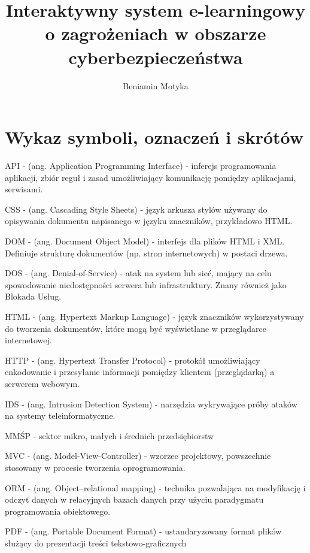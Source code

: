 \documentclass[12pt,twoside]{article}
\author{Beniamin Motyka}
\title{Interaktywny system e-learningowy o zagrożeniach w obszarze cyberbezpieczeństwa}
\begin{document}
\maketitle

\blankpage

\tableofcontents

\clearpage
\blankpage

\clearpage
\section*{Wykaz symboli, oznaczeń i skrótów}

API - (ang. Application Programming Interface) - inferejs programowania aplikacji, zbiór reguł i zasad umożliwiający komunikację pomiędzy aplikacjami, serwisami.

CSS - (ang. Cascading Style Sheets) - język arkusza stylów używany do opisywania dokumentu napisanego w języku znaczników, przykładowo HTML.

DOM - (ang. Document Object Model) - interfejs dla plików HTML i XML. Definiuje strukturę dokumentów (np. stron internetowych) w postaci drzewa.

DOS - (ang. Denial-of-Service) - atak na system lub sieć, mający na celu spowodowanie niedostępności serwera lub infrastruktury. Znany również jako Blokada Usług.

HTML - (ang. Hypertext Markup Language) - język znaczników wykorzystywany do tworzenia dokumentów, które mogą być wyświetlane w przeglądarce internetowej.

HTTP - (ang. Hypertext Transfer Protocol) - protokół umożliwiający enkodowanie i przesyłanie informacji pomiędzy klientem (przeglądarką) a serwerem webowym.

IDS - (ang. Intrusion Detection System) - narzędzia wykrywające próby ataków na systemy teleinformatyczne.

MMŚP - sektor mikro, małych i średnich przedsiębiorstw

MVC - (ang. Model-View-Controller) - wzorzec projektowy, powszechnie stosowany w procesie tworzenia oprogramowania. 

ORM - (ang. Object–relational mapping) - technika pozwalająca na modyfikację i odczyt danych w relacyjnych bazach danych przy użyciu paradygmatu programowania obiektowego.

PDF - (ang. Portable Document Format) - ustandaryzowany format plików służący do prezentacji treści tekstowo-graficznych
\end{document}
